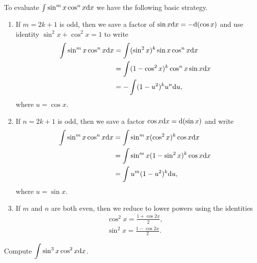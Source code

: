 

\begin{remark}
To evaluate $\int \sin^m x\cos^n x\mathrm{d} x$ we have the following basic strategy.
\begin{enumerate}
\item If $m=2k+1$ is odd, then we save a factor of $\sin x\mathrm{d} x = -\mathrm{d}(\cos x)$ and use identity $\sin^2 x + \cos^2 x = 1$ to write
\begin{equation*}
\begin{split}
\int \sin^m x \cos^n x\mathrm{d} x &= \int (\sin^2 x)^k\sin x\cos^n x\mathrm{d} x \\
&= \int (1-\cos^2 x)^k\cos^n x\sin x\mathrm{d} x\\
& = -\int (1-u^2)^ku^n\mathrm{d} u,
\end{split}
\end{equation*}
where $u=\cos x$.
\item If $n=2k+1$ is odd, then we save a factor $\cos x\mathrm{d} x = \mathrm{d}(\sin x)$ and write
\begin{equation*}
\begin{split}
\int \sin^m x \cos^n x\mathrm{d} x &= \int\sin^m x(\cos^2 x)^k\cos x\mathrm{d} x \\
&= \int\sin^m x(1-\sin^2 x)^k\cos x\mathrm{d} x \\
&= \int u^m(1-u^2)^k\mathrm{d} u,
\end{split}
\end{equation*}
where $u=\sin x$.
\item If $m$ and $n$ are both even, then we reduce to lower powers using the identities
\begin{align*}
\cos^2 x = \frac{1+\cos 2x}{2},\\
\sin^2 x = \frac{1-\cos 2x}{2}.
\end{align*}
\end{enumerate}
\end{remark}

\begin{example}
Compute $\displaystyle\int\sin^3 x\cos^2 x\mathrm{d} x$.
\end{example}
\ifdefined\SOLUTION
{}
\else
\fi

